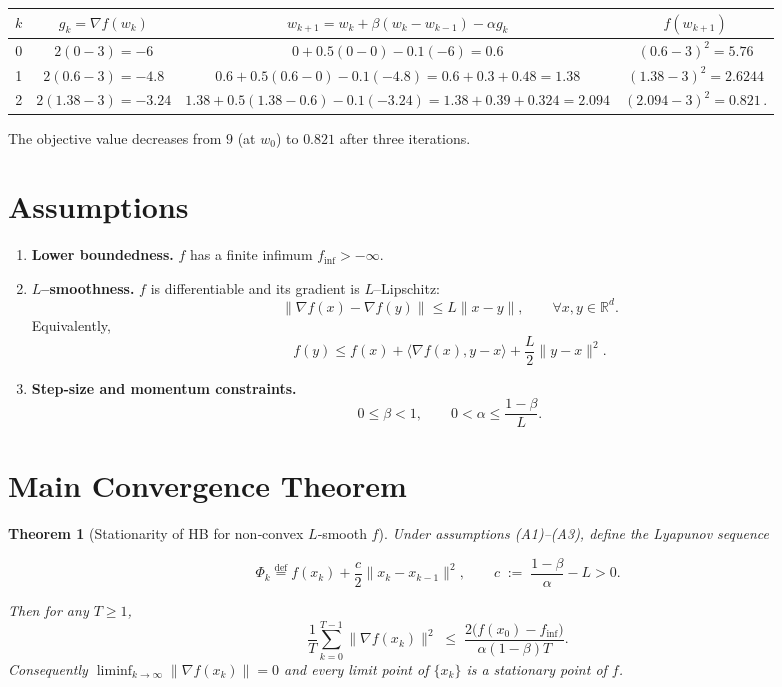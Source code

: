 \documentclass{article}
\newtheorem{theorem}{Theorem}
\newcommand{\R}{\mathbb{R}}
\begin{document}
\begin{center}
\begin{tabular}{c|c|c|c}
$k$ & $g_{k}= \nabla f(w_{k})$ & $w_{k+1}=w_{k}+ \beta(w_{k}-w_{k-1})-\alpha g_{k}$ & $f(w_{k+1})$\\ \hline
0 & $2(0-3)=-6$ & $0+0.5(0-0)-0.1(-6)=0.6$ & $(0.6-3)^{2}=5.76$\\
1 & $2(0.6-3)=-4.8$ & $0.6+0.5(0.6-0)-0.1(-4.8)=0.6+0.3+0.48=1.38$ & $(1.38-3)^{2}=2.6244$\\
2 & $2(1.38-3)=-3.24$ & $1.38+0.5(1.38-0.6)-0.1(-3.24)=1.38+0.39+0.324=2.094$ & $(2.094-3)^{2}=0.821\,.$
\end{tabular}
\end{center}
The objective value decreases from $9$ (at $w_{0}$) to $0.821$ after three iterations.

\newpage

\section*{Assumptions}
\begin{enumerate}
\item \textbf{Lower boundedness.} $f$ has a finite infimum $f_{\inf}>-\infty$.
\item \textbf{$L$–smoothness.} $f$ is differentiable and its gradient is $L$–Lipschitz:
\[
\|\nabla f(x)-\nabla f(y)\| \le L\|x-y\|,\qquad\forall x,y\in\R^{d}. \tag{A1}
\]
Equivalently,
\[
f(y)\le f(x)+\langle\nabla f(x),y-x\rangle+\frac{L}{2}\|y-x\|^{2}. \tag{A2}
\]
\item \textbf{Step‑size and momentum constraints.}
\[
0\le\beta<1,\qquad 0<\alpha\le\frac{1-\beta}{L}. \tag{A3}
\]
\end{enumerate}

\section*{Main Convergence Theorem}
\begin{theorem}[Stationarity of HB for non‑convex $L$‑smooth $f$]\label{thm:hb}
Under assumptions (A1)–(A3), define the Lyapunov sequence  

\[
\Phi_{k}\stackrel{\text{def}}{=}f(x_{k})+\frac{c}{2}\|x_{k}-x_{k-1}\|^{2},
\qquad c\;:=\;\frac{1-\beta}{\alpha}-L>0.
\]

Then for any $T\ge1$,
\[
\frac{1}{T}\sum_{k=0}^{T-1}\|\nabla f(x_{k})\|^{2}
\;\le\;
\frac{2\bigl(f(x_{0})-f_{\inf}\bigr)}{\alpha(1-\beta)T}. \tag{2}
\]
Consequently $\displaystyle\liminf_{k\to\infty}\|\nabla f(x_{k})\|=0$ and every limit point of $\{x_{k}\}$ is a stationary point of $f$.
\end{theorem}
\end{document}
